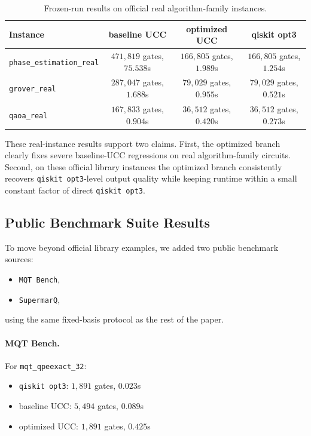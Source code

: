 \documentclass[11pt]{article}
\begin{document}
\begin{table}[h]
\centering
\begin{tabular}{lccc}
\toprule
Instance & baseline UCC & optimized UCC & qiskit opt3 \\
\midrule
\texttt{phase\_estimation\_real} & $471{,}819$ gates, $75.538$s & $166{,}805$ gates, $1.989$s & $166{,}805$ gates, $1.254$s \\
\texttt{grover\_real} & $287{,}047$ gates, $1.688$s & $79{,}029$ gates, $0.955$s & $79{,}029$ gates, $0.521$s \\
\texttt{qaoa\_real} & $167{,}833$ gates, $0.904$s & $36{,}512$ gates, $0.420$s & $36{,}512$ gates, $0.273$s \\
\bottomrule
\end{tabular}
\caption{Frozen-run results on official real algorithm-family instances.}
\label{tab:real-instances}
\end{table}

These real-instance results support two claims. First, the optimized branch clearly fixes severe baseline-UCC regressions on real algorithm-family circuits. Second, on these official library instances the optimized branch consistently recovers \texttt{qiskit opt3}-level output quality while keeping runtime within a small constant factor of direct \texttt{qiskit opt3}.

\subsection{Public Benchmark Suite Results}

To move beyond official library examples, we added two public benchmark sources:
\begin{itemize}[leftmargin=1.5em]
    \item \texttt{MQT Bench},
    \item \texttt{SupermarQ},
\end{itemize}
using the same fixed-basis protocol as the rest of the paper.

\paragraph{MQT Bench.}
For \texttt{mqt\_qpeexact\_32}:
\begin{itemize}[leftmargin=1.5em]
    \item \texttt{qiskit opt3}: $1{,}891$ gates, $0.023$s
    \item baseline UCC: $5{,}494$ gates, $0.089$s
    \item optimized UCC: $1{,}891$ gates, $0.425$s
\end{itemize}
\end{document}

